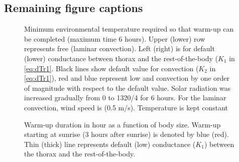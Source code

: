 \newpage
\subsection*{Remaining figure captions}
\begin{figure}[H]
\begin{center}
\caption{
	Minimum environmental temperature required so that warm-up can be completed (maximum time 6 hours).
	Upper (lower) row represents free (laminar convection).
	Left (right) is for default (lower) conductance between thorax and the rest-of-the-body ($K_1$ in \cref{eq:dTr1}.
	Black lines show default value for convection ($K_2$ in \cref{eq:dTr1}), red and blue represent low and convection by one order of magnitude with respect to the default value.
	Solar radiation was increased gradually from 0 to 1320/4 for 6 hours. 
	For the laminar convection,  wind speed is (0.5 m/s).
	Temperature is kept constant
}%
\label{fig3}
\end{center}
\end{figure}
\begin{figure}[H]
\begin{center}
\caption{
	Warm-up duration in hour as a function of body size. 
	Warm-up starting at sunrise (3 hours after sunrise) is denoted by blue (red). 
	Thin (thick) line represents default (low) conductance ($K_1$) between the thorax and the rest-of-the-body.
}%
\label{fig4}
\end{center}
\end{figure}

